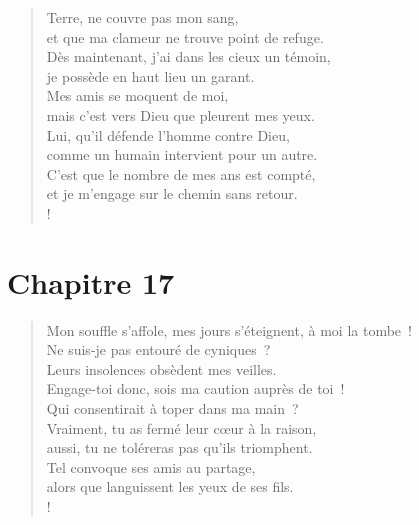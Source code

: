 \documentclass[french,twoside]{book} %
\def\mednobreak{\ifdim\lastskip<\medskipamount
  \removelastskip\nopagebreak\medskip\fi}
\newcommand{\labelblock}[1]{\medbreak{\noindent\color{rubric}\bfseries #1}\par\mednobreak}
\newcommand\chapteropen{} %
\newcommand\chaptercont{} %
\newcommand\chapterclose{} %
\begin{document}
\begin{verse}
Terre, ne couvre pas mon sang, \\
et que ma clameur ne trouve point de refuge.\\
Dès maintenant, j’ai dans les cieux un témoin, \\
je possède en haut lieu un garant.\\
Mes amis se moquent de moi, \\
mais c’est vers Dieu que pleurent mes yeux.\\
Lui, qu’il défende l’homme contre Dieu, \\
comme un humain intervient pour un autre.\\
C’est que le nombre de mes ans est compté, \\
et je m’engage sur le chemin sans retour.\\!
\end{verse}
\chapterclose


\chapteropen
\chapter[{Chapitre 17}]{Chapitre 17}\renewcommand{\leftmark}{Chapitre 17}


\chaptercont

\begin{verse}
Mon souffle s’affole, mes jours s’éteignent, à moi la tombe !\\
Ne suis-je pas entouré de cyniques ? \\
Leurs insolences obsèdent mes veilles.\\
Engage-toi donc, sois ma caution auprès de toi ! \\
Qui consentirait à toper dans ma main ?\\
Vraiment, tu as fermé leur cœur à la raison, \\
aussi, tu ne toléreras pas qu’ils triomphent.\\
Tel convoque ses amis au partage, \\
alors que languissent les yeux de ses fils.\\!
\end{verse}

\labelblock{La fable des peuples}
\end{document}
